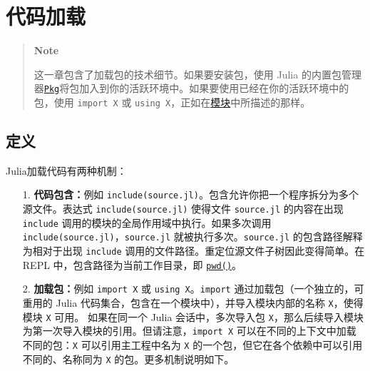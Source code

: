 \hypertarget{5835765330914877287}{}


\chapter{代码加载}



\begin{quote}
\textbf{Note}

这一章包含了加载包的技术细节。如果要安装包，使用 Julia 的内置包管理器\href{@ref Pkg}{\texttt{Pkg}}将包加入到你的活跃环境中。如果要使用已经在你的活跃环境中的包，使用 \texttt{import X} 或 \texttt{using X}，正如在\hyperlink{7031478671373133429}{模块}中所描述的那样。

\end{quote}


\hypertarget{5148923403283115982}{}


\section{定义}



Julia加载代码有两种机制：



\begin{itemize}
\item[1. ] \textbf{代码包含：}例如 \texttt{include({\textquotedbl}source.jl{\textquotedbl})}。包含允许你把一个程序拆分为多个源文件。表达式 \texttt{include({\textquotedbl}source.jl{\textquotedbl})} 使得文件 \texttt{source.jl} 的内容在出现 \texttt{include} 调用的模块的全局作用域中执行。如果多次调用 \texttt{include({\textquotedbl}source.jl{\textquotedbl})}，\texttt{source.jl} 就被执行多次。\texttt{source.jl} 的包含路径解释为相对于出现 \texttt{include} 调用的文件路径。重定位源文件子树因此变得简单。在 REPL 中，包含路径为当前工作目录，即 \hyperlink{16313884780490629439}{\texttt{pwd()}}。


\item[2. ] \textbf{加载包：}例如 \texttt{import X} 或 \texttt{using X}。\texttt{import} 通过加载包（一个独立的，可重用的 Julia 代码集合，包含在一个模块中），并导入模块内部的名称 \texttt{X}，使得模块 \texttt{X} 可用。 如果在同一个 Julia 会话中，多次导入包 \texttt{X}，那么后续导入模块为第一次导入模块的引用。但请注意，\texttt{import X} 可以在不同的上下文中加载不同的包：\texttt{X} 可以引用主工程中名为 \texttt{X} 的一个包，但它在各个依赖中可以引用不同的、名称同为 \texttt{X} 的包。更多机制说明如下。

\end{itemize}


